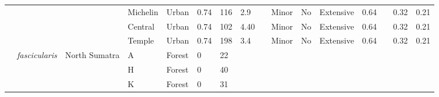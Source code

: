 \documentclass{../../../coursework}
\begin{document}
\begin{landscape}
\begin{longtabu}{XXXXXXXXXXXXXX[0.1]XX}
                    &  &  & Michelin & Urban & 0.74 & 116 & 2.9 &  & Minor & No & Extensive & 0.64 &  & 0.32 & 0.21 \\
                    &  &  & Central & Urban & 0.74 & 102 & 4.40 &  & Minor & No & Extensive & 0.64 &  & 0.32 & 0.21 \\
                    &  &  & Temple & Urban & 0.74 & 198 & 3.4 &  & Minor & No & Extensive & 0.64 &  & 0.32 & 0.21 \\
                \hline \textcite{van99} & \textit{fascicularis} & North Sumatra & A & Forest & 0 & 22 &  &  &  &  &  &  &  &  &  \\
                    &  &  & H & Forest & 0 & 40 &  &  &  &  &  &  &  &  &  \\
                    &  &  & K & Forest & 0 & 31 &  &  &  &  &  &  &  &  &  \\                    
        \end{longtabu}
\end{landscape}
\end{document}
